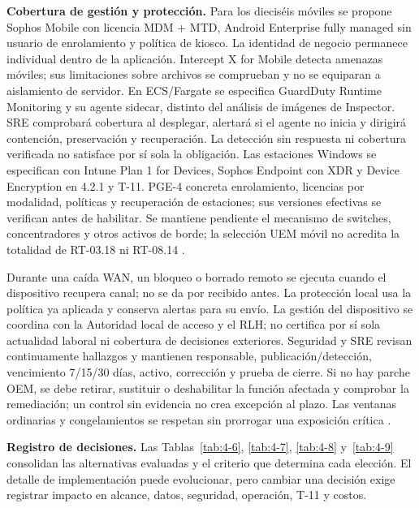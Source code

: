 \textbf{Cobertura de gestión y protección.} Para los dieciséis móviles se propone Sophos Mobile con licencia MDM + MTD, Android Enterprise fully managed sin usuario de enrolamiento y política de kiosco. La identidad de negocio permanece individual dentro de la aplicación. Intercept X for Mobile detecta amenazas móviles; sus limitaciones sobre archivos se comprueban y no se equiparan a aislamiento de servidor. En ECS/Fargate se especifica GuardDuty Runtime Monitoring y su agente sidecar, distinto del análisis de imágenes de Inspector. SRE comprobará cobertura al desplegar, alertará si el agente no inicia y dirigirá contención, preservación y recuperación. La detección sin respuesta ni cobertura verificada no satisface por sí sola la obligación. Las estaciones Windows se especifican con Intune Plan 1 for Devices, Sophos Endpoint con XDR y Device Encryption en 4.2.1 y T-11. PGE-4 concreta enrolamiento, licencias por modalidad, políticas y recuperación de estaciones; sus versiones efectivas se verifican antes de habilitar. Se mantiene pendiente el mecanismo de switches, concentradores y otros activos de borde; la selección UEM móvil no acredita la totalidad de RT-03.18 ni RT-08.14 \parencites{p3-sophos-modos,p3-sophos-userless,p3-sophos-licencias,p3-sophos-mtd,p3-guardduty,p3-guardduty-regiones}.

Durante una caída WAN, un bloqueo o borrado remoto se ejecuta cuando el dispositivo recupera canal; no se da por recibido antes. La protección local usa la política ya aplicada y conserva alertas para su envío. La gestión del dispositivo se coordina con la Autoridad local de acceso y el RLH; no certifica por sí sola actualidad laboral ni cobertura de decisiones exteriores. Seguridad y SRE revisan continuamente hallazgos y mantienen responsable, publicación/detección, vencimiento 7/15/30 días, activo, corrección y prueba de cierre. Si no hay parche OEM, se debe retirar, sustituir o deshabilitar la función afectada y comprobar la remediación; un control sin evidencia no crea excepción al plazo. Las ventanas ordinarias y congelamientos se respetan sin prorrogar una exposición crítica \parencite[RT-11.04, p.~23]{pucv-transversal}.



\textbf{Registro de decisiones.} Las Tablas~\ref{tab:4-6}, \ref{tab:4-7}, \ref{tab:4-8} y~\ref{tab:4-9} consolidan las alternativas evaluadas y el criterio que determina cada elección. El detalle de implementación puede evolucionar, pero cambiar una decisión exige registrar impacto en alcance, datos, seguridad, operación, T-11 y costos.

